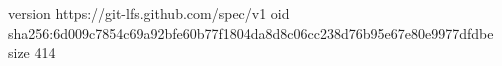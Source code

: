 version https://git-lfs.github.com/spec/v1
oid sha256:6d009c7854c69a92bfe60b77f1804da8d8c06cc238d76b95e67e80e9977dfdbe
size 414
